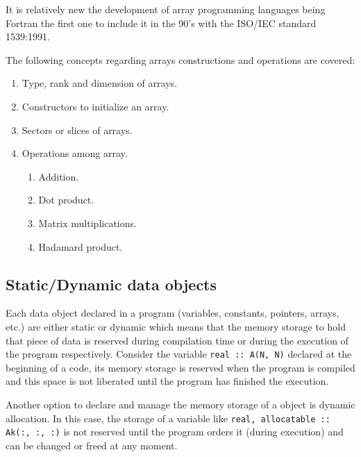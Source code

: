 It is relatively new the development of array programming languages being Fortran the first one to include it in the 90's with the 
ISO/IEC standard 1539:1991. 

The following concepts regarding arrays constructions and operations are covered:

\begin{enumerate} 
    \item Type, rank and dimension of arrays.
    \item Constructors to initialize an array. 
    \item Sectors or slices of arrays. 
    \item Operations among array. 
    
    \begin{enumerate}
        \item Addition. 
        \item Dot product.
        \item Matrix multiplications. 
        \item Hadamard product. 
    \end{enumerate}  
    
\end{enumerate} 

    \vspace{-.5cm}
    \subsection*{Static/Dynamic data objects}

Each data object declared in a program (variables, constants, pointers, arrays, etc.) are either static or dynamic 
which means that the memory storage to hold that piece of data is reserved during compilation time or 
during the execution of the program respectively. Consider the variable \texttt{real :: A(N, N)} declared at the 
beginning of a code, its memory storage is reserved when the program is compiled and this space is not liberated 
until the program has finished the execution. 

Another option to declare and manage the memory storage of a object is dynamic allocation. In this case, the 
storage of a variable like \texttt{real, allocatable :: Ak(:, :, :)} is not reserved until 
the program orders it (during execution) and can be changed or freed at any moment.





\newpage 
